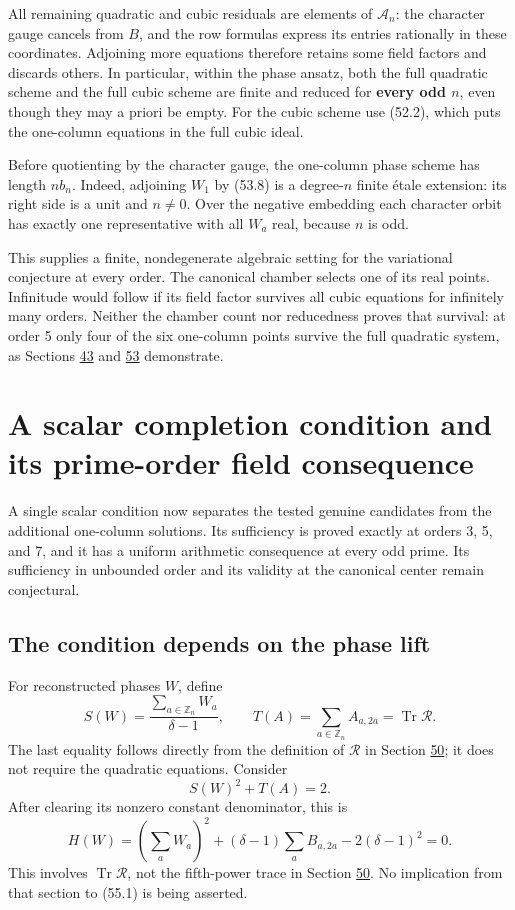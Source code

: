 \documentclass[11pt,reqno]{amsart}
\theoremstyle{plain}
\begin{document}
All remaining quadratic and cubic residuals are elements of
\(\mathcal A_n\): the character gauge cancels from \(B\), and the
row formulas express its entries rationally in these coordinates.
Adjoining more equations therefore retains some field factors and
discards others. In particular, within the phase ansatz, both the full
quadratic scheme and the full cubic scheme are finite and reduced
for \textbf{every odd \(n\)}, even though they may a priori be empty.
For the cubic scheme use (52.2), which puts the one-column equations
in the full cubic ideal.

Before quotienting by the character gauge, the one-column phase
scheme has length \(n b_n\). Indeed, adjoining \(W_1\) by (53.8)
is a degree-\(n\) finite \'etale extension: its right side is a unit and
\(n\ne0\). Over the negative embedding each character orbit has
exactly one representative with all \(W_a\) real, because \(n\) is
odd.

This supplies a finite, nondegenerate algebraic setting for the
variational conjecture at every order. The canonical chamber selects
one of its real points. Infinitude would follow if its field factor
survives all cubic equations for infinitely many orders. Neither the
chamber count nor reducedness proves that survival: at order 5 only
four of the six one-column points survive the full quadratic system,
as Sections \hyperref[sec:43]{43} and \hyperref[sec:53]{53} demonstrate.

\section{A scalar completion condition and its prime-order field consequence}\label{sec:55}

A single scalar condition now separates the tested genuine candidates
from the additional one-column solutions. Its sufficiency is proved
exactly at orders 3, 5, and 7, and it has a uniform arithmetic
consequence at every odd prime. Its sufficiency in unbounded order and
its validity at the canonical center remain conjectural.

\subsection{The condition depends on the phase lift}\label{sec:55.1}

For reconstructed phases \(W\), define
\[
 S(W)=\frac{\sum_{a\in\mathbb Z_n}W_a}{\delta-1},\qquad
 T(A)=\sum_{a\in\mathbb Z_n}A_{a,2a}=\operatorname{Tr}\mathcal R.
\]
The last equality follows directly from the definition of \(\mathcal R\)
in Section \hyperref[sec:50]{50}; it does not require the quadratic equations. Consider
\begin{equation*}
 \boxed{S(W)^2+T(A)=2.}\tag{55.1}
\end{equation*}
After clearing its nonzero constant denominator, this is
\begin{equation*}
 H(W)=\left(\sum_a W_a\right)^2
       +(\delta-1)\sum_aB_{a,2a}-2(\delta-1)^2=0.
 \tag{55.2}
\end{equation*}
This involves \(\operatorname{Tr}\mathcal R\), not the fifth-power
trace in Section \hyperref[sec:50]{50}. No implication from that section to (55.1) is
being asserted.
\end{document}
